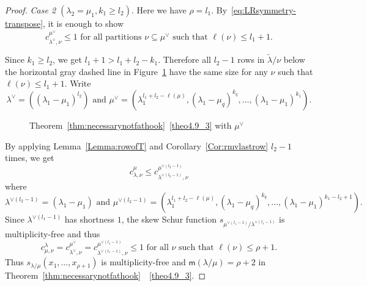 \documentclass[ALCO,ThmDefs,Unicode,epreuves]{cedram}
\newcommand{\msf}{\mathsf{m}}
\DeclareMathOperator{\rotate}{rotate}
\newenvironment{Case}[1]{\par\vskip2pt\noindent%
\emph{#1}.}{\vskip2pt}
\begin{document}
\begin{proof}
\begin{Case}
{Case 2 $(\lambda_2 = \mu_1, k_1\geq l_2)$} 
Here we have $\rho = l_1$. By~\eqref{eq:LRsymmetry-transpose}, it is enough to show
\[
c^{\mu^\vee}_{\lambda^\vee,\nu}\leq 1\text{ for all partitions }\nu\subseteq \mu^\vee \text{ such that }\ell(\nu)\leq l_1+1.
\]


Since $k_1\geq l_2$, we get $l_1+1 > l_1+l_2-k_1$. Therefore all $l_2-1$ rows in $\tilde\lambda/\nu$ below the horizontal gray dashed line in Figure~\ref{case2anecessary} have the same size for any $\nu$ such that $\ell(\nu)\leq l_1+1$. 
Write
\[
\lambda^\vee = ((\lambda_1-\mu_1)^{l_2})\text{ and }\mu^\vee = (\lambda_1^{l_1+l_2-\ell(\mu)},(\lambda_1-\mu_q)^{k_q},\ldots,(\lambda_1-\mu_1)^{k_1}).
\]

\begin{figure}[htb]\centering
 \caption{Theorem~\ref{thm:necessarynotfathook}~\ref{theo4.9_3} with $\mu^\vee$}
 \label{case2anecessary} 

\end{figure}

\noindent
By applying Lemma~\ref{Lemma:rowofT} and Corollary~\ref{Cor:rmvlastrow} $l_2-1$ times, we get
\[
c^{\mu}_{\lambda,\nu} \leq c^{\mu^{\vee(l_2-1)}}_{\lambda^{\vee(l_2-1)},\nu}
\]
where
\[
\lambda^{\vee(l_2-1)} = (\lambda_1-\mu_1)\text{ and }\mu^{\vee(l_2-1)} = (\lambda_1^{l_1+l_2-\ell(\mu)},(\lambda_1-\mu_q)^{k_q},\ldots,(\lambda_1-\mu_1)^{k_1-l_2+1}).
\]
Since $\lambda^{\vee(l_1-1)}$ has shortness $1$, the skew Schur function $s_{\mu^{\vee(l_1-1)}/\lambda^{\vee(l_1-1)}}$ is multiplicity-free and thus 
\[
c^{\lambda}_{\mu,\nu} = c^{\mu^\vee}_{\lambda^\vee,\nu} = c^{\mu^{\vee(l_1-1)}}_{\lambda^{\vee(l_1-1)},\nu} \leq 1\text{ for all }\nu\text{ such that }\ell(\nu)\leq \rho+1.
\]
Thus $s_{\lambda/\mu}(x_1,\ldots,x_{\rho+1})$ is multiplicity-free and ${\msf }(\lambda/\mu) = \rho+2$ in Theorem~\ref{thm:necessarynotfathook}~~\ref{theo4.9_3}.\qedhere
\end{Case}



\end{proof}
\end{document}
